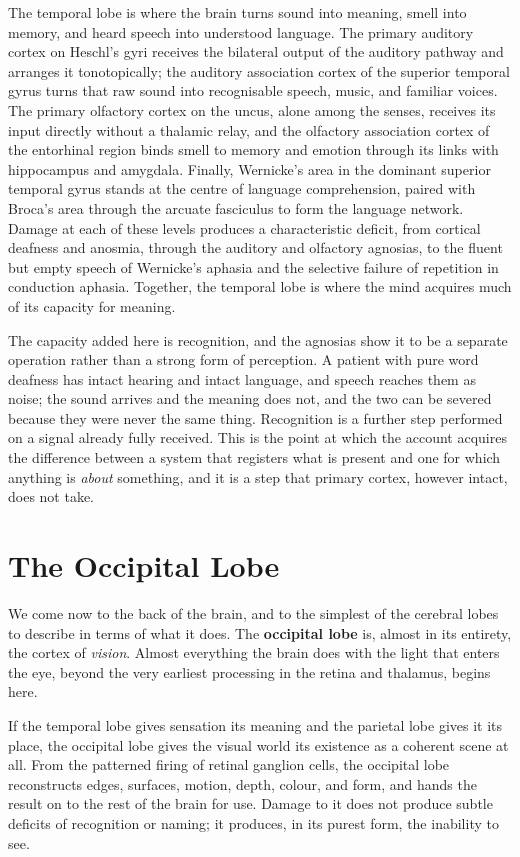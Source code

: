 \documentclass[11pt]{article}
\begin{document}
The temporal lobe is where the brain turns sound into meaning, smell into memory, and heard speech into understood language. The primary auditory cortex on Heschl's gyri receives the bilateral output of the auditory pathway and arranges it tonotopically; the auditory association cortex of the superior temporal gyrus turns that raw sound into recognisable speech, music, and familiar voices. The primary olfactory cortex on the uncus, alone among the senses, receives its input directly without a thalamic relay, and the olfactory association cortex of the entorhinal region binds smell to memory and emotion through its links with hippocampus and amygdala. Finally, Wernicke's area in the dominant superior temporal gyrus stands at the centre of language comprehension, paired with Broca's area through the arcuate fasciculus to form the language network. Damage at each of these levels produces a characteristic deficit, from cortical deafness and anosmia, through the auditory and olfactory agnosias, to the fluent but empty speech of Wernicke's aphasia and the selective failure of repetition in conduction aphasia. Together, the temporal lobe is where the mind acquires much of its capacity for meaning.

The capacity added here is recognition, and the agnosias show it to be a separate operation rather than a strong form of perception. A patient with pure word deafness has intact hearing and intact language, and speech reaches them as noise; the sound arrives and the meaning does not, and the two can be severed because they were never the same thing. Recognition is a further step performed on a signal already fully received. This is the point at which the account acquires the difference between a system that registers what is present and one for which anything is \textit{about} something, and it is a step that primary cortex, however intact, does not take.

\section{The Occipital Lobe}

We come now to the back of the brain, and to the simplest of the cerebral lobes to describe in terms of what it does. The \textbf{occipital lobe} is, almost in its entirety, the cortex of \textit{vision}. Almost everything the brain does with the light that enters the eye, beyond the very earliest processing in the retina and thalamus, begins here.

If the temporal lobe gives sensation its meaning and the parietal lobe gives it its place, the occipital lobe gives the visual world its existence as a coherent scene at all. From the patterned firing of retinal ganglion cells, the occipital lobe reconstructs edges, surfaces, motion, depth, colour, and form, and hands the result on to the rest of the brain for use. Damage to it does not produce subtle deficits of recognition or naming; it produces, in its purest form, the inability to see.
\end{document}

